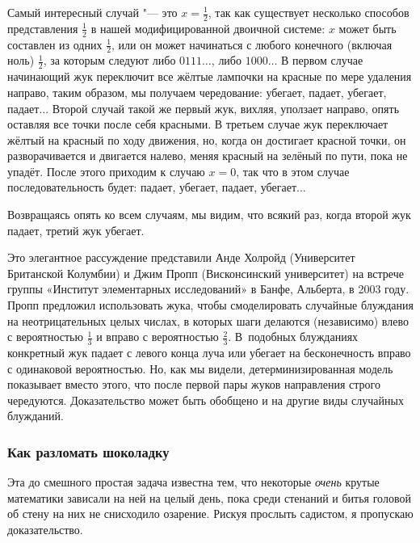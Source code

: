 \documentclass[twoside]{book}
\begin{document}
Самый интересный случай "--- это $x=\tfrac12$, так как существует несколько способов представления  $\tfrac12$ в нашей модифицированной двоичной системе: $x$ может быть составлен из одних $\tfrac12$, или он может начинаться с любого конечного  (включая ноль) $\tfrac12$, за которым следуют либо $0111\dots$, либо $1000\dots$
В первом случае начинающий жук переключит все жёлтые лампочки на красные по мере удаления направо, таким образом, мы получаем чередование: убегает, падает, убегает, падает...
Второй случай такой же\change{,}{:} первый жук, вихляя, уползает направо, опять оставляя все точки после себя красными.
В третьем случае жук переключает жёлтый на красный по ходу движения, но, когда он достигает красной точки, он разворачивается и двигается налево, меняя красный на зелёный по пути, пока не упадёт.
После этого приходим к случаю $x = 0$, так что в этом случае  последовательность будет: падает, убегает, падает, убегает...

Возвращаясь опять ко всем случаям, мы видим, что всякий раз, когда второй жук падает, третий жук убегает.
\heart

Это элегантное рассуждение представили
Анде Холройд (Университет Британской Колумбии) и Джим Пропп (Висконсинский университет) на встрече группы «Институт элементарных исследований» в Банфе, Альберта, в 2003 году. %
Пропп предложил использовать жука, чтобы  смоделировать случайные блуждания на неотрицательных целых числах, в которых шаги делаются (независимо) влево с вероятностью $\tfrac13$ и вправо с вероятностью $\tfrac23$.
В~подобных блужданиях конкретный жук падает с левого конца луча или убегает на бесконечность вправо с одинаковой вероятностью.
Но, как мы видели, детерминизированная модель показывает вместо этого, что после первой пары жуков направления строго чередуются.
Доказательство может быть обобщено и на другие виды случайных блужданий.

\subsubsection*{Как разломать шоколадку}%

Эта до смешного простая задача известна тем, что некоторые \emph{очень} крутые математики зависали на ней на целый день, пока среди  стенаний и битья головой об стену на них не снисходило озарение.
Рискуя прослыть садистом, я пропускаю доказательство.
\end{document}

